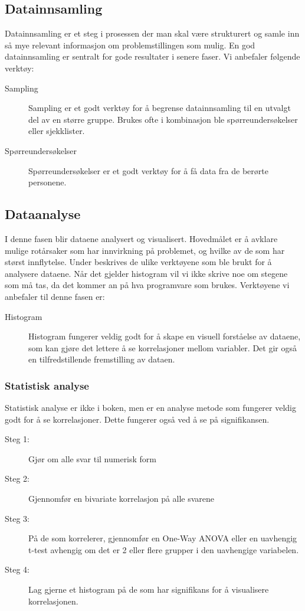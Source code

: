 \subsection{Datainnsamling}
Datainnsamling er et steg i prosessen der man skal være strukturert og samle inn så mye relevant informasjon om problemstillingen som mulig. En god datainnsamling er sentralt for gode resultater i senere faser. Vi anbefaler følgende verktøy:

\begin{description}
    \item[Sampling] Sampling er et godt verktøy for å begrense datainnsamling til en utvalgt del av en større gruppe. Brukes ofte i kombinasjon ble spørreundersøkelser eller sjekklister.
    \item[Spørreundersøkelser] Spørreundersøkelser er et godt verktøy for å få data fra de berørte personene.
\end{description}

\subsection{Dataanalyse}
I denne fasen blir dataene analysert og visualisert. Hovedmålet er å avklare mulige rotårsaker som har innvirkning på problemet, og hvilke av de som har størst innflytelse. Under beskrives de ulike verktøyene som ble brukt for å analysere dataene.
Når det gjelder histogram vil vi ikke skrive noe om stegene som må tas, da det kommer an på hva programvare som brukes. Verktøyene vi anbefaler til denne fasen er:

\begin{description}
    \item[Histogram] Histogram fungerer veldig godt for å skape en visuell forståelse av dataene, som kan gjøre det lettere å se korrelasjoner mellom variabler. Det gir også en tilfredstillende fremstilling av dataen. 
\end{description}

\subsubsection{Statistisk analyse}
Statistisk analyse er ikke i boken, men er en analyse metode som fungerer veldig godt for å se korrelasjoner. Dette fungerer også ved å se på signifikansen.
\begin{description}
    \item[Steg 1:] Gjør om alle svar til numerisk form
    \item[Steg 2:] Gjennomfør en bivariate korrelasjon på alle svarene
    \item[Steg 3:] På de som korrelerer, gjennomfør en One-Way ANOVA eller en uavhengig t-test avhengig om det er 2 eller flere grupper i den uavhengige variabelen.
    \item[Steg 4:] Lag gjerne et histogram på de som har signifikans for å visualisere korrelasjonen.
\end{description}

